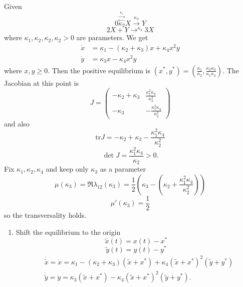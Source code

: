 \documentclass{article}
\newcommand*{\half}[1]{\frac{#1}{2}}
\newcommand*{\tr}{\text{tr}}
\newcommand*{\mattwo}[4]{\begin{pmatrix}
    #1&#2\\#3&#4
\end{pmatrix}}
\begin{document}
\begin{exam}[Brusselator]
    Given
    $$0 \stackrel{\stackrel{\kappa_1}{\rightarrow}}{\stackrel{\leftarrow}{\kappa_2}} X \stackrel{\kappa_3}{\rightarrow} Y$$
    $$2X+Y\rightarrow^{\kappa_4}3X$$
    where $\kappa_1,\kappa_2,\kappa_2,\kappa_2 > 0$ are parameters. We get
    $$\begin{aligned}
        \dot x&= \kappa_1-(\kappa_2+\kappa_3)x+\kappa_4x^2y\\
        \dot y &= \kappa_3x-\kappa_4x^2y
    \end{aligned}$$
    where $x,y\geq 0$. Then the
    positive equilibrium is $(x^*,y^*) = \left(\frac{\kappa_1}{\kappa_2},\frac{\kappa_2\kappa_3}{\kappa_1\kappa_4}\right)$. The Jacobian at this point is
    $$J=\mattwo{-\kappa_2+\kappa_3}{\frac{\kappa_1^2\kappa_4}{\kappa_2^2}}{-\kappa_3}{-\frac{\kappa_1^2\kappa_4}{\kappa_2^2}}$$ and also
    $$\tr J=-\kappa_2+\kappa_3-\frac{\kappa_1^2\kappa_4}{\kappa_2^2}$$
    $$\det J=\frac{\kappa_1^2\kappa_4}{\kappa_2} > 0.$$
    Fix $\kappa_1,\kappa_2,\kappa_4$ and keep only $\kappa_3$ as a parameter
    $$\mu(\kappa_3) = \Re \lambda_{12}(\kappa_3) = \half1\left(\kappa_3-\left(\kappa_2+\frac{\kappa_1^2\kappa_4}{\kappa_2^2}\right)\right)$$
    $$\mu'(\kappa_3) = \half1$$
    so the transversality holds.
    \begin{enumerate}
        \item Shift the equilibrium to the origin
        $$\tilde x(t) = x(t)-x^*$$
        $$\tilde y(t) = y(t)-y^*$$
        $$\begin{aligned}
            &\dot{\tilde x} = \dot x = \kappa_1-(\kappa_2+\kappa_3)(\tilde x+x^*)+\kappa_4(\tilde x+x^*)^2(\tilde y+y^*)\\
            &\dot{\tilde y} = \dot y = \kappa_3(\tilde x+x^*)-\kappa_4(\tilde x+x^*)^2(\tilde y+y^*).
        \end{aligned}$$


\end{enumerate}
\end{exam}
\end{document}
